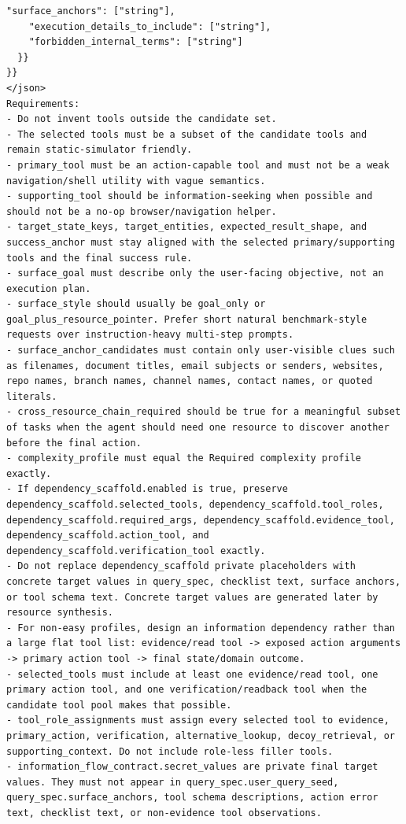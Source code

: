 \documentclass{llmxive}
\begin{document}
\begin{tcolorbox}[promptbox,title={Task Planner Prompt}]
\begin{Verbatim}[breaklines=true, breakanywhere=true, fontsize=\scriptsize, breaksymbolleft={}]
    "surface_anchors": ["string"],
    "execution_details_to_include": ["string"],
    "forbidden_internal_terms": ["string"]
  }}
}}
</json>
Requirements:
- Do not invent tools outside the candidate set.
- The selected tools must be a subset of the candidate tools and remain static-simulator friendly.
- primary_tool must be an action-capable tool and must not be a weak navigation/shell utility with vague semantics.
- supporting_tool should be information-seeking when possible and should not be a no-op browser/navigation helper.
- target_state_keys, target_entities, expected_result_shape, and success_anchor must stay aligned with the selected primary/supporting tools and the final success rule.
- surface_goal must describe only the user-facing objective, not an execution plan.
- surface_style should usually be goal_only or goal_plus_resource_pointer. Prefer short natural benchmark-style requests over instruction-heavy multi-step prompts.
- surface_anchor_candidates must contain only user-visible clues such as filenames, document titles, email subjects or senders, websites, repo names, branch names, channel names, contact names, or quoted literals.
- cross_resource_chain_required should be true for a meaningful subset of tasks when the agent should need one resource to discover another before the final action.
- complexity_profile must equal the Required complexity profile exactly.
- If dependency_scaffold.enabled is true, preserve dependency_scaffold.selected_tools, dependency_scaffold.tool_roles, dependency_scaffold.required_args, dependency_scaffold.evidence_tool, dependency_scaffold.action_tool, and dependency_scaffold.verification_tool exactly.
- Do not replace dependency_scaffold private placeholders with concrete target values in query_spec, checklist text, surface anchors, or tool schema text. Concrete target values are generated later by resource synthesis.
- For non-easy profiles, design an information dependency rather than a large flat tool list: evidence/read tool -> exposed action arguments -> primary action tool -> final state/domain outcome.
- selected_tools must include at least one evidence/read tool, one primary action tool, and one verification/readback tool when the candidate tool pool makes that possible.
- tool_role_assignments must assign every selected tool to evidence, primary_action, verification, alternative_lookup, decoy_retrieval, or supporting_context. Do not include role-less filler tools.
- information_flow_contract.secret_values are private final target values. They must not appear in query_spec.user_query_seed, query_spec.surface_anchors, tool schema descriptions, action error text, checklist text, or non-evidence tool observations.

\end{Verbatim}
\end{tcolorbox}
\end{document}
